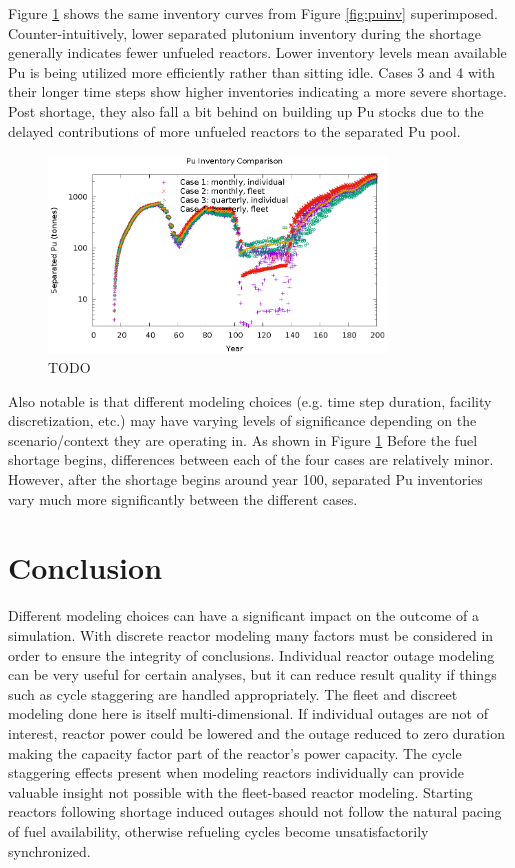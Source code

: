 \documentclass{style}
\begin{document}
Figure \ref{fig:puinv-compare} shows the same inventory curves from Figure
\ref{fig:puinv} superimposed. Counter-intuitively, lower separated plutonium
inventory during the shortage generally indicates fewer unfueled reactors.
Lower inventory levels mean available Pu is being utilized more efficiently
rather than sitting idle.  Cases 3 and 4 with their longer time steps show
higher inventories indicating a more severe shortage.  Post shortage, they
also fall a bit behind on building up Pu stocks due to the delayed
contributions of more unfueled reactors to the separated Pu pool.

\begin{figure}[!h]
    \centering
    \includegraphics[width=0.8\textwidth]{exp2/puinv-compare.eps}
    \caption[TODO]{
        TODO
    }
    \label{fig:puinv-compare}
\end{figure}

Also notable is that different modeling choices (e.g. time step duration,
facility discretization, etc.) may have varying levels of significance
depending on the scenario/context they are operating in.  As shown in Figure
\ref{fig:puinv-compare} Before the fuel shortage begins, differences between
each of the four cases are relatively minor.  However, after the shortage
begins around year 100, separated Pu inventories vary much more significantly
between the different cases.

\section{Conclusion}

Different modeling choices can have a significant impact on the outcome of a
simulation.  With discrete reactor modeling many factors must be considered in
order to ensure the integrity of conclusions.  Individual reactor outage
modeling can be very useful for certain analyses, but it can reduce result
quality if things such as cycle staggering are handled appropriately.  The
fleet and discreet modeling done here is itself multi-dimensional.  If
individual outages are not of interest, reactor power could be lowered and the
outage reduced to zero duration making the capacity factor part of the
reactor's power capacity.  The cycle staggering effects present when modeling
reactors individually can provide valuable insight not possible with the
fleet-based reactor modeling.  Starting reactors following shortage induced
outages should not follow the natural pacing of fuel availability, otherwise
refueling cycles become unsatisfactorily synchronized.
\end{document}

